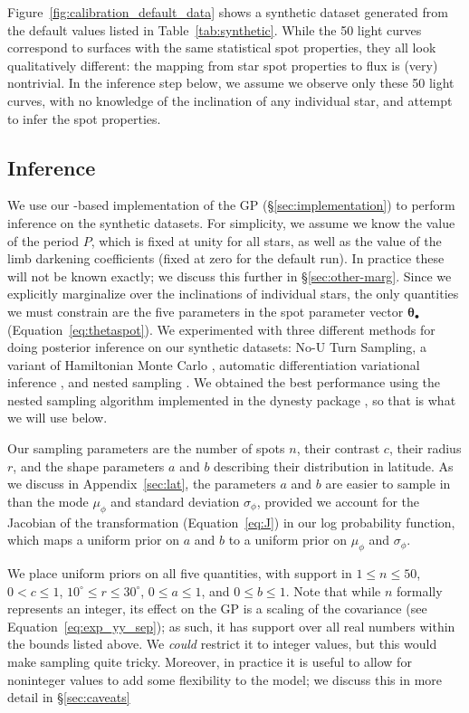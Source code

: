 \documentclass[modern]{aastex62}
\begin{document}
Figure~\ref{fig:calibration_default_data} shows a synthetic dataset generated
from the default values listed in Table~\ref{tab:synthetic}. While the 50
light curves correspond to surfaces with the same statistical spot properties,
they all look qualitatively different: the mapping from star spot properties
to flux is (very) nontrivial. In the inference step below, we assume we observe
only these 50 light curves, with no knowledge of the inclination of any individual
star, and attempt to infer the spot properties.

\subsection{Inference}
\label{sec:calibration-inference}
We use our \Python-based implementation of the GP (\S\ref{sec:implementation})
to perform inference on the synthetic datasets. For simplicity, we assume we
know the value of the period $P$, which is fixed at unity for all stars, as well
as the value of the limb darkening coefficients (fixed at zero for the default
run). In practice these will not be known exactly; we discuss this further in
\S\ref{sec:other-marg}. Since we explicitly marginalize over the inclinations
of individual stars, the only quantities we must constrain are the five
parameters in the spot parameter vector $\pmb{\theta}_\bullet$
(Equation~\ref{eq:thetaspot}). We experimented with three different methods
for doing posterior inference on our synthetic datasets: No-U Turn Sampling,
a variant of Hamiltonian Monte Carlo
\citep[NUTS;][]{Duane1987,Hoffman2011}, automatic differentiation
variational inference \citep[ADVI;][]{Kucukelbir2016,Blei2016}, and nested sampling \citep{Skilling2004,Skilling2006}.
We obtained the best performance using the nested sampling algorithm
implemented in the \textsf{dynesty} package \citep{Speagle2020}, so that is what
we will use below.

Our sampling parameters are the number of spots $n$, their contrast $c$,
their radius $r$, and the shape parameters $a$ and $b$ describing their
distribution in latitude. As we discuss in Appendix~\ref{sec:lat},
the parameters $a$ and $b$ are easier to sample in than
the mode $\mu_\phi$ and standard deviation $\sigma_\phi$, provided we
account for the Jacobian of the transformation (Equation~\ref{eq:J})
in our log probability function, which maps a uniform prior on $a$ and $b$
to a uniform prior on $\mu_\phi$ and $\sigma_\phi$.

We place uniform priors on all five quantities, with support in
$1 \leq n \leq 50$, $0 < c \leq 1$,
$10^\circ \leq r \leq 30^\circ$,
$0 \leq a \leq 1$, and
$0 \leq b \leq 1$. Note that while $n$ formally represents an integer,
its effect on the GP is a scaling of the covariance (see Equation~\ref{eq:exp_yy_sep});
as such, it has support over all real numbers within the bounds listed
above. We \emph{could} restrict it to integer values, but this would make
sampling quite tricky. Moreover, in practice it is useful to allow for
noninteger values to add some flexibility to the model; we discuss this
in more detail in \S\ref{sec:caveats}
\end{document}
